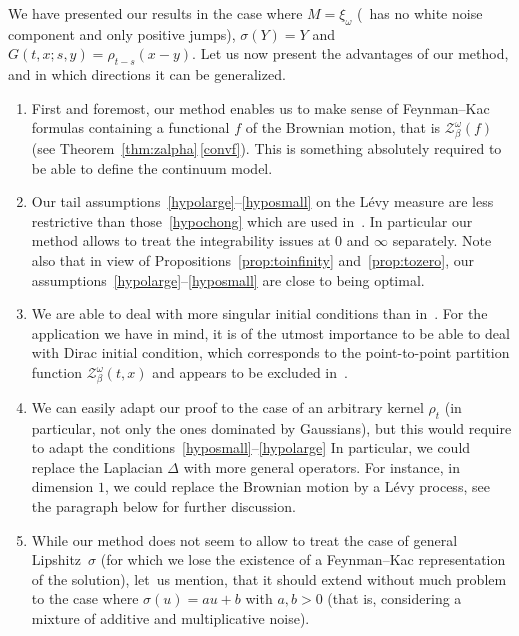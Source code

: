 \documentclass[JEP,XML,SOM,Unicode,published]{cedram}
\let\mathcal\mathscr
\newenvironment{enumeratea}
{\bgroup\def\theenumi{\alph{enumi}}\begin{enumerate}}
{\end{enumerate}\egroup}
\theoremstyle{definition}
\newcommand{\cZ}{{\ensuremath{\mathcal Z}} }
\let\gb\beta
\let\gD\Delta
\let\go\omega
\begin{document}
We have presented our results in the case where
$M=\xi_{\go}$ (\ie ~has no white noise component and only positive jumps), $\sigma(Y)=Y$ and $G(t,x ;s,y) =\rho_{t-s}(x-y)$.
Let us now present the advantages of our method, and in which directions it can be generalized.
\begin{enumeratea}
\item
First and foremost, our method enables us to make sense of Feynman--Kac formulas containing a functional $f$ of the Brownian motion, that is $\cZ^\go_{\beta}(f)$ (see Theorem~\ref{thm:zalpha}\,\eqref{convf}). This is something absolutely required to be able to define the continuum model.

\item
Our tail assumptions~\eqref{hypolarge}--\eqref{hyposmall} on the Lévy measure are less restrictive
than those~\eqref{hypochong} which are used in~\cite{Chong17}. In particular our method allows to treat the integrability issues at $0$ and $\infty$ separately.
Note also that in view of Propositions~\ref{prop:toinfinity} and~\ref{prop:tozero}, our assumptions~\eqref{hypolarge}--\eqref{hyposmall} are close to being optimal.

\item
We are able to deal with more singular initial conditions
than in~\cite{Chong17}. For the application we have in mind, it is of the utmost importance to be able to deal with Dirac initial condition, which corresponds to the point-to-point partition function $\cZ_{\gb}^{\go}(t,x)$ and appears to be excluded in~\cite{Chong17}.

\item
We can easily adapt our proof to the case
of an arbitrary kernel $\rho_t$ (in particular, not only the ones dominated by Gaussians), but this would require to adapt
the conditions~\eqref{hyposmall}--\eqref{hypolarge}
In particular, we could replace the Laplacian $\gD$ with more general operators. For instance, in dimension $1$, we could replace the Brownian motion by a Lévy process,
see the paragraph below for further discussion.

\item
While our method does not seem to allow to treat the case of general Lipshitz~$\sigma$ (for which we lose the existence of a Feynman--Kac representation of the solution), let~us mention, that it should extend without much problem to the case where \hbox{$\sigma(u)=au+b$} with $a,b>0$ (that is, considering a mixture of additive and multiplicative noise).


\end{enumeratea}
\end{document}
